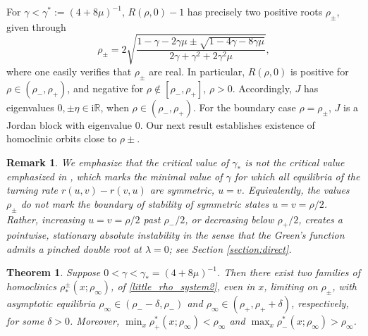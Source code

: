 \documentclass[10pt]{article}
\newtheorem{Theorem}{Theorem}
\newtheorem{Remark}[Lemma]{Remark}
\newcommand{\R}{\mathbb{R}}
\newcommand{\rmi}{\mathrm{i}}
\begin{document}
For $\gamma < \gamma^* := (4 + 8\mu)^{-1}$, $R(\rho,0) -1$ has precisely two positive roots $\rho_\pm$, given through
\begin{equation}
\rho_{\pm} =2\sqrt{\frac{1 - \gamma - 2  \gamma \mu \pm \sqrt{
        1 - 4 \gamma - 
         8  \gamma \mu}}{2\gamma + \gamma^2 + 
      2 \gamma^2 \mu}},
\label{roots}
\end{equation}
where one easily verifies that $\rho_\pm$ are real. In particular,  $R(\rho,0)$ is positive for $\rho \in (\rho_-,\rho_+)$, and negative for $\rho\not\in [\rho_-,\rho_+]$, $\rho>0$. Accordingly,  $J$ has eigenvalues $0, \pm\eta\in\rmi\R$, when $\rho \in (\rho_-,\rho_+)$. For the boundary case $\rho = \rho_\pm$, $J$ is a  Jordan block with eigenvalue 0. Our next result establishes existence of homoclinic orbits close to $\rho\pm$. 

\begin{Remark}
 We emphasize that the critical value of $\gamma_*$ is \emph{not} the critical value emphasized in \cite{scheel2016wavenumber}, which marks the minimal value of $\gamma$ for which all equilibria of the turning rate $r(u,v)-r(v,u)$ are symmetric, $u=v$. Equivalently, the values $\rho_\pm$ do not mark the boundary of stability of symmetric states $u=v=\rho/2$. Rather, increasing $u=v=\rho/2$ past $\rho_-/2$, or decreasing below $\rho_+/2$, creates a pointwise, stationary absolute instability in the sense that the Green's function admits a pinched double root at $\lambda=0$; see Section \ref{section:direct}.
\end{Remark}



\begin{Theorem}\label{theorem:perturbation} Suppose $0<\gamma <\gamma_*=(4+8\mu)^{-1}$. Then there exist two families of homoclinics $\rho_*^\pm(x;\rho_\infty)$,  of \eqref{little_rho_system2}, even in $x$, limiting on $\rho_\pm$, with asymptotic equilibria $\rho_\infty\in (\rho_--\delta,\rho_-)$ and $\rho_\infty\in (\rho_+,\rho_++\delta)$, respectively, for some $\delta>0$. Moreover, $\min_x\rho^*_+(x;\rho_\infty)<\rho_\infty$ and $\max_x\rho^*_-(x;\rho_\infty)>\rho_\infty$.
\end{Theorem}
\end{document}
